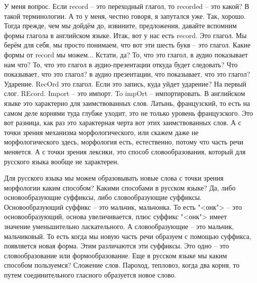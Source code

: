 \documentclass[main.tex]{subfiles}
\begin{document}
У меня вопрос.
Если record -- это переходный глагол, то recorded -- это какой? В такой терминологии.
А то у меня, честно говоря, я запутался уже.
Так, хорошо.
Тогда прежде, чем мы дойдём до, извините, предложения, давайте вспомним формы глагола в английском языке.
Итак, вот у нас есть record.
Это глагол.
Мы берём для себя, мы просто понимаем, что вот эти шесть букв -- это глагол.
Какие формы от record мы можем...
Кстати, да?
То, что это глагол, в аудио показывает нам что?
То, что это глагол в аудио-презентации откуда будет следовать?
Что показывает, что это глагол?
в аудио презентации, что показывает, что это глагол?
Ударение.
RecOrd это глагол.
Если это запись, куда уйдет ударение?
На первый слог.
REcord.
Import -- это импорт.
To impOrt -- импортировать.
В английском языке это характерно для заимствованных слов.
Латынь, французский, то есть на самом деле корнями туда глубже уходит, это не только уровень французского.
Это вот разница, как раз это характерная черта вот этих заимствованных слов.
А с точки зрения механизма морфологического, или скажем даже не морфологического здесь, морфология есть, естественно, потому что часть речи меняется.
А с точки зрения лексики, это способ словообразования, который для русского языка вообще не характерен.

Для русского языка мы можем образовывать новые слова с точки зрения морфологии каким способом?
Какими способами в русском языке?
Да, либо основообразующие суффиксы, либо словообразующие суффиксы.
Основообразующий суффикс -- это мальчик, мальчонка.
То есть "<онк"> -- это основообразующий, основа увеличивается, плюс суффикс "<онк"> имеет значение уменьшительно ласкательного.
А словообразующие -- это мальчик, мальчиковый.
То есть когда мы новую часть речи образуем с помощью суффикса, появляется новая форма.
Этим различаются эти суффиксы.
Это одно -- это словообразование или формообразование.
Еще в русском языке мы каким способом пользуемся?
Сложение слов.
Пароход, тепловоз, когда два корня, то путем соединительного гласного образуется новое слово.
\end{document}
